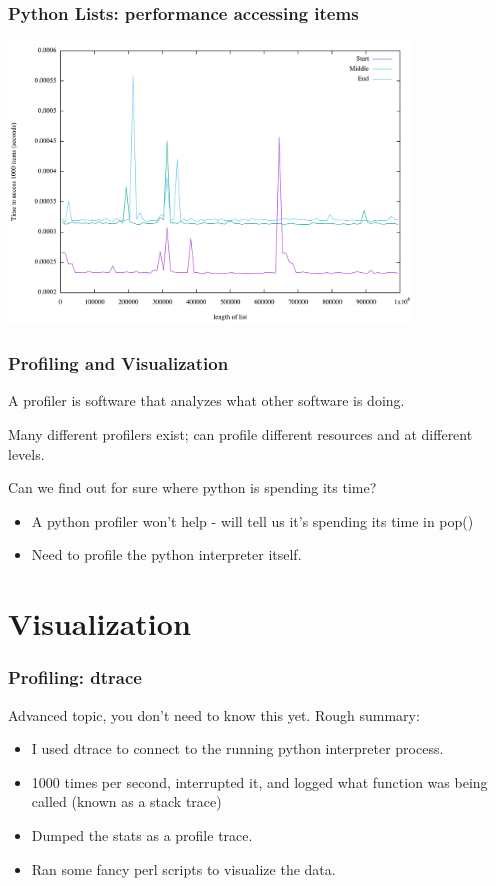 \documentclass{beamer} %
\begin{document}
\begin{frame}
  \frametitle{Python Lists: performance accessing items}
  \centering
\includegraphics[height=75mm]{tests/testaccess.pdf}
\end{frame}

\begin{frame}
  \frametitle{Profiling and Visualization}
  A profiler is software that analyzes what other software is doing.

  \vspace{2mm}
  Many different profilers exist; can profile different resources and at different levels.

  \vspace{2mm}
  Can we find out for sure where python is spending its time?
  \begin{itemize}
  \item A python profiler won't help - will tell us it's spending its time in pop()
  \item Need to profile the python interpreter itself.
  \end{itemize}
\end{frame}

\section{Visualization}

\begin{frame}
  \frametitle{Profiling: dtrace}
  Advanced topic, you don't need to know this yet.  Rough summary:

  \begin{itemize}
  \item I used dtrace to connect to the running python interpreter process.
  \item 1000 times per second, interrupted it, and logged what function was being called (known as a stack trace)
  \item Dumped the stats as a profile trace.
  \item Ran some fancy perl scripts to visualize the data.
  \end{itemize}
\end{frame}
    
\end{document}
